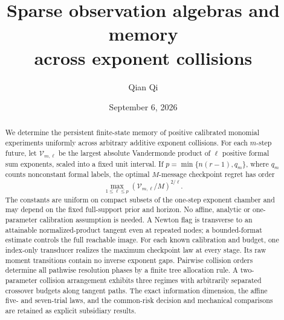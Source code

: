 \documentclass[11pt]{amsart}
\title[Memory across exponent collisions]{Sparse observation algebras and memory\\ across exponent collisions}
\author{Qian Qi}
\date{September 6, 2026}
\theoremstyle{definition}\newtheorem{definition}[theorem]{Definition}
\theoremstyle{remark}\newtheorem{remark}[theorem]{Remark}
\begin{document}
\begin{abstract}
We determine the persistent finite-state memory of positive calibrated
monomial experiments uniformly across arbitrary additive exponent
collisions. For each $m$-step future, let $\mathcal V_{m,\ell}$ be the
largest absolute Vandermonde product of $\ell$ positive formal sum
exponents, scaled into a fixed unit interval. If
$p=\min\{n(r-1),q_m\}$, where $q_m$ counts nonconstant formal labels,
the optimal $M$-message checkpoint regret has order
\[
 \max_{1\le\ell\le p}
       (\mathcal V_{m,\ell}/M)^{2/\ell}.
\]
The constants are uniform on compact subsets of the one-step exponent
chamber and may depend on the fixed full-support prior and horizon.
No affine, analytic or one-parameter calibration assumption is needed.
A Newton flag is transverse to an attainable normalized-product tangent
even at repeated nodes; a bounded-format estimate controls the full
reachable image. For each known calibration and budget, one index-only
transducer realizes the maximum checkpoint law at every stage. Its raw
moment transitions contain no inverse exponent gaps. Pairwise collision
orders determine all pathwise resolution phases by a finite tree
allocation rule. A two-parameter collision arrangement exhibits three
regimes with arbitrarily separated crossover budgets along tangent paths.
The exact information dimension, the affine five- and seven-trial laws,
and the common-risk decision and mechanical comparisons are retained as
explicit subsidiary results.
\end{abstract}
\maketitle













\end{document}
